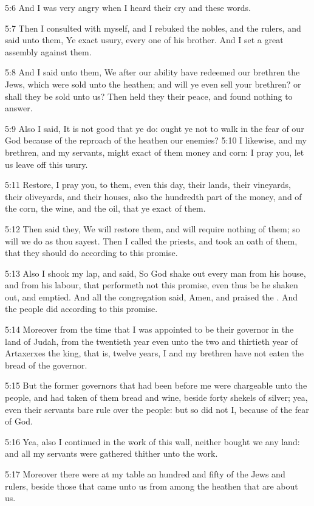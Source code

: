 5:6 And I was very angry when I heard their cry and these words.

5:7 Then I consulted with myself, and I rebuked the nobles, and the
rulers, and said unto them, Ye exact usury, every one of his brother.
And I set a great assembly against them.

5:8 And I said unto them, We after our ability have redeemed our
brethren the Jews, which were sold unto the heathen; and will ye even
sell your brethren? or shall they be sold unto us? Then held they
their peace, and found nothing to answer.

5:9 Also I said, It is not good that ye do: ought ye not to walk in
the fear of our God because of the reproach of the heathen our
enemies?  5:10 I likewise, and my brethren, and my servants, might
exact of them money and corn: I pray you, let us leave off this usury.

5:11 Restore, I pray you, to them, even this day, their lands, their
vineyards, their oliveyards, and their houses, also the hundredth part
of the money, and of the corn, the wine, and the oil, that ye exact of
them.

5:12 Then said they, We will restore them, and will require nothing of
them; so will we do as thou sayest. Then I called the priests, and
took an oath of them, that they should do according to this promise.

5:13 Also I shook my lap, and said, So God shake out every man from
his house, and from his labour, that performeth not this promise, even
thus be he shaken out, and emptied. And all the congregation said,
Amen, and praised the \LORD. And the people did according to this
promise.

5:14 Moreover from the time that I was appointed to be their governor
in the land of Judah, from the twentieth year even unto the two and
thirtieth year of Artaxerxes the king, that is, twelve years, I and my
brethren have not eaten the bread of the governor.

5:15 But the former governors that had been before me were chargeable
unto the people, and had taken of them bread and wine, beside forty
shekels of silver; yea, even their servants bare rule over the people:
but so did not I, because of the fear of God.

5:16 Yea, also I continued in the work of this wall, neither bought we
any land: and all my servants were gathered thither unto the work.

5:17 Moreover there were at my table an hundred and fifty of the Jews
and rulers, beside those that came unto us from among the heathen that
are about us.

